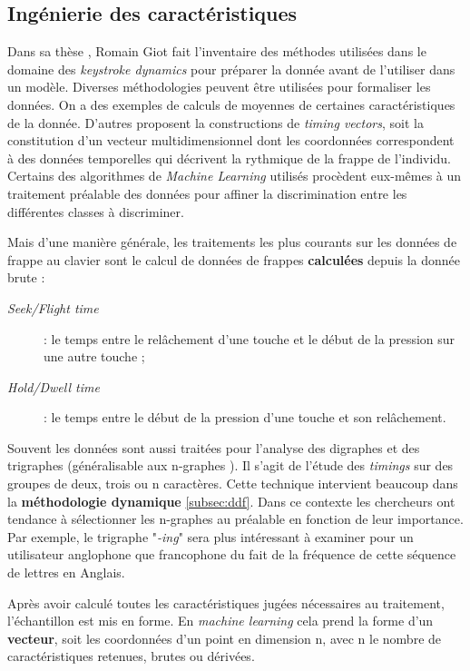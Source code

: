 \subsection{Ingénierie des caractéristiques}
\label{subsec:featureengineering}

Dans sa thèse \cite{giotThese}, Romain Giot fait l'inventaire des méthodes utilisées dans le domaine des \textit{keystroke dynamics} pour préparer la donnée avant de l'utiliser dans un modèle. Diverses méthodologies peuvent être utilisées pour formaliser les données. On a des exemples de calculs de moyennes de certaines caractéristiques de la donnée. D'autres proposent la constructions de \textit{timing vectors}\cite{killourhy2009}, soit la constitution d'un vecteur multidimensionnel dont les coordonnées correspondent à des données temporelles qui décrivent la rythmique de la frappe de l'individu.\\

Certains des algorithmes de \textit{Machine Learning} utilisés procèdent eux-mêmes à un traitement préalable des données pour affiner la discrimination entre les différentes classes à discriminer.

Mais d'une manière générale, les traitements les plus courants sur les données de frappe au clavier sont le calcul de données de frappes \textbf{calculées} depuis la donnée brute :

\begin{description}
	\item[\textit{Seek/Flight time}] : le temps entre le relâchement d'une touche et le début de la pression sur une autre touche ;
	\item[\textit{Hold/Dwell time}] : le temps entre le début de la pression d'une touche et son relâchement. \cite{kobojekRNN}
\end{description}

Souvent les données sont aussi traitées pour l'analyse des digraphes et des trigraphes (généralisable aux n-graphes \cite{Hu2008}). Il s'agit de l'étude des \textit{timings} sur des groupes de deux, trois ou n caractères. Cette technique intervient beaucoup dans la \textbf{méthodologie dynamique} \ref{subsec:ddf}. Dans ce contexte les chercheurs ont tendance à sélectionner les n-graphes au préalable en fonction de leur importance. Par exemple, le trigraphe "\textit{-ing}" sera plus intéressant à examiner pour un utilisateur anglophone que francophone du fait de la fréquence de cette séquence de lettres en Anglais.

Après avoir calculé toutes les caractéristiques jugées nécessaires au traitement, l'échantillon est mis en forme. En \textit{machine learning} cela prend la forme d'un \textbf{vecteur}, soit les coordonnées d'un point en dimension n, avec n le nombre de caractéristiques retenues, brutes ou dérivées.